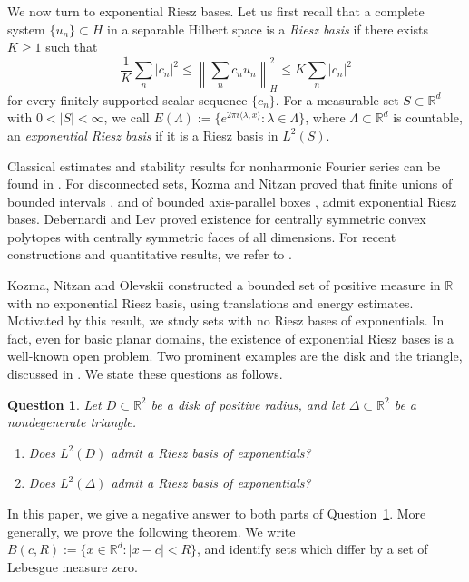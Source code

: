 \documentclass[12pt,reqno,tbtags]{amsart}
\newtheorem{question}{Question}[section]
\def\R{\mathbb{R}}
\newcommand\inpro[2]{\langle #1,#2\rangle}
\newcommand\1{\mathbbm{1}}
\newcommand\Norm[2]{\left\|#1\right\|_{#2}}
\begin{document}
We now turn to exponential Riesz bases. Let us first recall that a complete system
$\{u_n\}\subset H$ in a separable Hilbert space is a \emph{Riesz basis}
if there exists $K\ge1$ such that
\begin{equation}\label{eq:riesz-basis}
    \frac{1}{K}\sum_n|c_n|^2
    \le \Norm{\sum_n c_nu_n}{H}^{2}
    \le K\sum_n|c_n|^2
\end{equation}
for every finitely supported scalar sequence $\{c_n\}$.
For a measurable set $S\subset\R^d$ with $0<|S|<\infty$, we call
$E(\Lambda):=\{e^{2\pi i\inpro{\lambda}{x}}:\lambda\in\Lambda\}$,
where $\Lambda\subset\R^d$ is countable, an \emph{exponential Riesz basis}
if it is a Riesz basis in $L^2(S)$.

Classical estimates and stability results for nonharmonic Fourier series
can be found in \cite{I36,K64}. For disconnected sets, Kozma and Nitzan proved that finite
unions of bounded intervals \cite{KN15}, and of bounded axis-parallel boxes
\cite{KN16}, admit exponential Riesz bases.
Debernardi and Lev \cite{DL22} proved existence for centrally symmetric convex
polytopes with centrally symmetric faces of all dimensions.
For recent constructions and quantitative results, we refer to
\cite{AD26,BM24,L24,PRW24}.

Kozma, Nitzan and Olevskii \cite{KNO23} constructed a bounded set of positive measure
in $\R$ with no exponential Riesz basis, using translations and energy estimates.
Motivated by this result, we study sets with no Riesz bases of exponentials.
In fact, even for basic planar domains,
the existence of exponential Riesz bases is a
well-known open problem. Two prominent examples are the disk and the triangle,
discussed in \cite{KNO23}. We state these questions as follows.

\begin{question}\label{ques:disk-triangle}
Let $D\subset\R^2$ be a disk of positive radius, and let $\Delta\subset\R^2$
be a nondegenerate triangle.
\begin{enumerate}
    \item[(i)] Does $L^2(D)$ admit a Riesz basis of exponentials?
    \item[(ii)] Does $L^2(\Delta)$ admit a Riesz basis of exponentials?
\end{enumerate}
\end{question}

In this paper, we give a negative answer to both parts of
Question~\ref{ques:disk-triangle}. More generally, we prove the following theorem.
We write $B(c,R):=\{x\in\R^d:|x-c|<R\}$, and identify sets which differ by a set
of Lebesgue measure zero.
\end{document}
